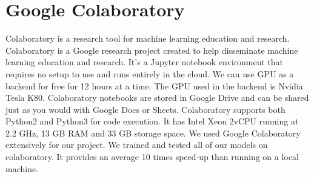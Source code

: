 \section{Google Colaboratory} %
\label{sec:google_colaboratory}
Colaboratory is a research tool for machine learning education and research. Colaboratory is a Google research project created to help disseminate machine learning education and research. It’s a Jupyter notebook environment that requires no setup to use and runs entirely in the cloud. We can use GPU as a backend for free for 12 hours at a time. The GPU used in the backend is Nvidia Tesla K80. Colaboratory notebooks are stored in Google Drive and can be shared just as you would with Google Docs or Sheets. Colaboratory supports both Python2 and Python3 for code execution. It has Intel Xeon 2vCPU running at 2.2 GHz, 13 GB RAM and 33 GB storage space.
We used Google Colaboratory extensively for our project. We trained and tested all of our models on colaboratory. It provides an average 10 times speed-up than running on a local machine. 





